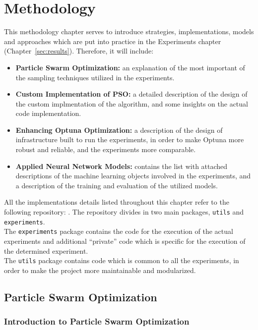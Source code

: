 \chapter{Methodology}\label{sec:methodology}

This methodology chapter serves to introduce strategies, implementations, models and approaches which are put into practice in the Experiments chapter (Chapter~\ref{sec:results}). Therefore, it will include:
\begin{itemize}[itemsep=0.1cm]
    \item \textbf{Particle Swarm Optimization:} an explanation of the most important of the sampling techniques utilized in the experiments.
    \item \textbf{Custom Implementation of PSO:} a detailed description of the design of the custom implmentation of the algorithm, and some insights on the actual code implementation.
    \item \textbf{Enhancing Optuna Optimization:} a description of the design of infrastructure built to run the experiments, in order to make Optuna more robust and reliable, and the experiments more comparable.
    \item \textbf{Applied Neural Network Models:} contains the list with attached descriptions of the machine learning objects involved in the experiments, and a description of the training and evaluation of the utilized models.
\end{itemize}

All the implementations details listed throughout this chapter refer to the following repository: \cite{Repository-THESIS}.
The repository divides in two main packages, \texttt{utils} and \texttt{experiments}.
\\[0.3cm]The \texttt{experiments} package contains the code for the execution of the actual experiments and additional “private” code which is specific for the execution of the determined experiment.
\\[0.3cm]The \texttt{utils} package contains code which is common to all the experiments, in order to make the project more maintainable and modularized.

\section{Particle Swarm Optimization}

\subsection{Introduction to Particle Swarm Optimization}

